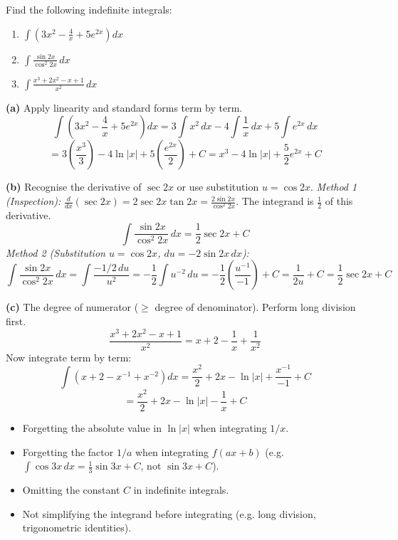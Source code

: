 \documentclass[11pt]{article}
\begin{document}
\begin{exemplebox}
Find the following indefinite integrals:
\begin{enumerate}
    \item $\displaystyle \int \left( 3x^2 - \frac{4}{x} + 5e^{2x} \right) dx$
    \item $\displaystyle \int \frac{\sin 2x}{\cos^2 2x}\,dx$
    \item $\displaystyle \int \frac{x^3+2x^2-x+1}{x^2}\,dx$
\end{enumerate}
\end{exemplebox}

\begin{exoresolu}
\textbf{(a)} Apply linearity and standard forms term by term.
\[
\int \left( 3x^2 - \frac{4}{x} + 5e^{2x} \right) dx = 3\int x^2\,dx - 4\int \frac{1}{x}\,dx + 5\int e^{2x}\,dx
\]
\[
= 3\left(\frac{x^3}{3}\right) - 4\ln|x| + 5\left(\frac{e^{2x}}{2}\right) + C = \boxed{x^3 - 4\ln|x| + \frac{5}{2}e^{2x} + C}
\]

\textbf{(b)} Recognise the derivative of $\sec 2x$ or use substitution $u=\cos 2x$.
\emph{Method 1 (Inspection):} $\frac{d}{dx}(\sec 2x) = 2\sec 2x \tan 2x = \frac{2\sin 2x}{\cos^2 2x}$.
The integrand is $\frac{1}{2}$ of this derivative.
\[
\int \frac{\sin 2x}{\cos^2 2x}\,dx = \frac{1}{2}\sec 2x + C
\]
\emph{Method 2 (Substitution $u=\cos 2x$, $du=-2\sin 2x\,dx$):}
\[
\int \frac{\sin 2x}{\cos^2 2x}\,dx = \int \frac{-1/2\, du}{u^2} = -\frac{1}{2}\int u^{-2}\,du = -\frac{1}{2}\left(\frac{u^{-1}}{-1}\right)+C = \frac{1}{2u}+C = \boxed{\frac{1}{2}\sec 2x + C}
\]

\textbf{(c)} The degree of numerator ($\ge$ degree of denominator). Perform long division first.
\[
\frac{x^3+2x^2-x+1}{x^2} = x + 2 - \frac{1}{x} + \frac{1}{x^2}
\]
Now integrate term by term:
\[
\int \left( x + 2 - x^{-1} + x^{-2} \right) dx = \frac{x^2}{2} + 2x - \ln|x| + \frac{x^{-1}}{-1} + C
\]
\[
= \boxed{\frac{x^2}{2} + 2x - \ln|x| - \frac{1}{x} + C}
\]
\end{exoresolu}

\begin{attention}
\begin{itemize}
    \item Forgetting the absolute value in $\ln|x|$ when integrating $1/x$.
    \item Forgetting the factor $1/a$ when integrating $f(ax+b)$ (e.g. $\int \cos 3x\,dx = \frac{1}{3}\sin 3x + C$, not $\sin 3x + C$).
    \item Omitting the constant $C$ in indefinite integrals.
    \item Not simplifying the integrand before integrating (e.g. long division, trigonometric identities).
\end{itemize}
\end{attention}
\end{document}
